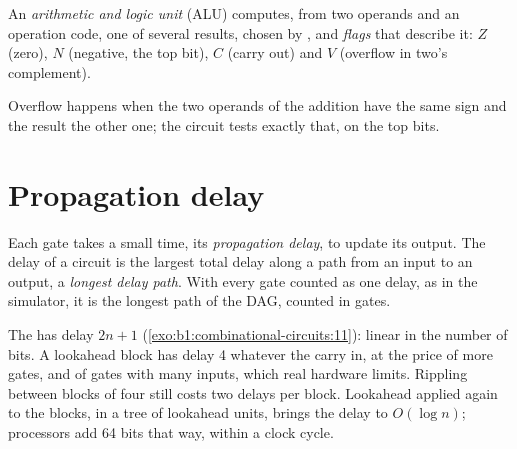 \begin{definition}\label{def:b1:combinational-circuits:alu}
An \emph{arithmetic and logic unit} (ALU) computes, from two operands and an operation
code, one of several results, chosen by , and \emph{flags} that describe it: $Z$ (zero), $N$ (negative, the
top bit), $C$ (carry out) and $V$ (overflow in two's complement).
\end{definition}

\label{lst:b1:combinational-circuits:alu}

\label{out:b1:combinational-circuits:alu}

Overflow happens when the two operands of the addition have the same sign and the result the other one; the circuit
tests exactly that, on the top bits.

\section{Propagation delay}\label{sec:b1:combinational-circuits:delay}

\begin{definition}\label{def:b1:combinational-circuits:delay}
Each gate takes a small time, its \emph{propagation delay}, to update its output. The delay of a
circuit is the largest total delay along a path from an input to an output, a \emph{longest delay path}. With every gate counted as one delay, as in the simulator, it is the longest path of the DAG, counted in
gates.
\end{definition}

\label{out:b1:combinational-circuits:adders}

The  has delay $2n + 1$ (\cref{exo:b1:combinational-circuits:11}): linear in the number of bits. A
lookahead block has delay 4 whatever the carry in, at the price of more gates, and of gates with many inputs, which real
hardware limits. Rippling between blocks of four still costs two delays per block. Lookahead applied again to the blocks,
in a tree of lookahead units, brings the delay to $O(\log n)$; processors add 64 bits that way, within a clock cycle.

